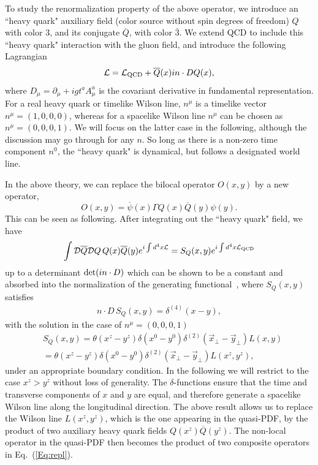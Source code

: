 \documentclass[prd,aps,twocolumn,preprintnumbers, showpacs, nofootinbib,superscriptaddress,notitlepage]{revtex4-1}
\newcommand{\beq}{\begin{eqnarray}}
\newcommand{\eeq}{\end{eqnarray}}
\def \non {\nonumber}
\begin{document}
To study the renormalization property of the above operator, we introduce an ``heavy quark" auxiliary field (color source without spin degrees of freedom)
$Q$ with color 3,
and its conjugate ${\overline Q}$, with color ${\bar 3}$. 
We extend QCD to include this ``heavy quark" interaction with the gluon field,  and introduce the following Lagrangian
\beq\label{Eq:lag}
{\cal L}={\cal L_{\text{QCD}}}+\overline Q(x)i n\cdot D Q(x),
\eeq
where $D_\mu=\partial_\mu+igt^a A^a_\mu$ is the covariant derivative in fundamental representation. For a real heavy quark or timelike Wilson line, $n^\mu$ is a timelike vector $n^\mu=(1,0,0,0)$, whereas for a spacelike Wilson line $n^\mu$ can be chosen as $n^\mu=(0,0,0,1)$. We will focus on the latter case in the following, although the discussion may go through for any $n$.
So long as there is a non-zero time component $n^0$, the ``heavy quark" is dynamical, but follows a designated world line.

In the above theory, we can replace the bilocal operator $O(x,y)$ by a new operator,
\begin{equation}\label{Eq:repl}
             O(x, y) = \overline{\psi}(x)\Gamma Q(x) \overline{Q}(y) \psi(y).
\end{equation}
This can be seen as following. After integrating out the ``heavy quark" field, we have
\beq
\int {\cal D}\overline Q{\cal D}Q\, Q(x)\overline Q(y) e^{i\int d^4x {\cal L}}=S_Q(x, y) e^{i\int d^4x {\cal L_{\text{QCD}}}}
\eeq
up to a determinant ${\rm det}(in\cdot D)$ which can be shown to be a constant and absorbed into the normalization of the generating functional~\cite{Mannel:1991mc}, where $S_Q(x, y)$ satisfies
\beq
n\cdot D\, S_Q(x, y)=\delta^{(4)}(x-y),
\eeq
with the solution in the case of $n^\mu=(0,0,0,1)$
\begin{align}
&S_Q(x,y)=\theta(x^z-y^z)\delta(x^0-y^0)\delta^{(2)}(\vec x_\perp-\vec y_\perp)L(x,y)\non\\
&=\theta(x^z-y^z)\delta(x^0-y^0)\delta^{(2)}(\vec x_\perp-\vec y_\perp)L(x^z,y^z),
\end{align}
under an appropriate boundary condition. In the following we will restrict to the case $x^z>y^z$ without loss of generality. The $\delta$-functions ensure that the time and transverse components of $x$ and $y$ are equal, and therefore generate a spacelike Wilson line along the longitudinal direction. The above result allows us to replace the Wilson line $L(x^z,y^z)$, which is the one appearing in the quasi-PDF, by the product of two auxiliary heavy quark fields $Q(x^z)\overline Q(y^z)$. The non-local operator in the quasi-PDF then becomes the product of two composite operators in Eq.~(\ref{Eq:repl}).
\end{document}
